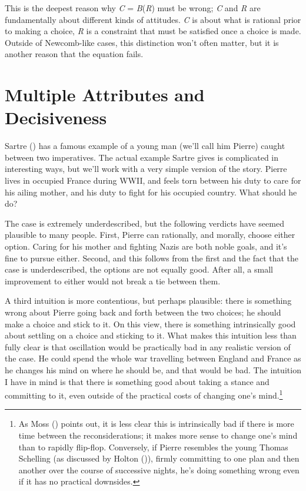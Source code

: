 \documentclass[
  11pt,
  letterpaper,
  DIV=11,
  numbers=noendperiod,
  twoside]{scrartcl}
\begin{document}
This is the deepest reason why \emph{C} = \emph{B}(\emph{R}) must be
wrong; \emph{C} and \emph{R} are fundamentally about different kinds of
attitudes. \emph{C} is about what is rational prior to making a choice,
\emph{R} is a constraint that must be satisfied once a choice is made.
Outside of Newcomb-like cases, this distinction won't often matter, but
it is another reason that the equation fails.

\section{Multiple Attributes and Decisiveness}\label{sec-sartre}

Sartre () has a famous example of a
young man (we'll call him Pierre) caught between two imperatives. The
actual example Sartre gives is complicated in interesting ways, but
we'll work with a very simple version of the story. Pierre lives in
occupied France during WWII, and feels torn between his duty to care for
his ailing mother, and his duty to fight for his occupied country. What
should he do?

The case is extremely underdescribed, but the following verdicts have
seemed plausible to many people. First, Pierre can rationally, and
morally, choose either option. Caring for his mother and fighting Nazis
are both noble goals, and it's fine to pursue either. Second, and this
follows from the first and the fact that the case is underdescribed, the
options are not equally good. After all, a small improvement to either
would not break a tie between them.

A third intuition is more contentious, but perhaps plausible: there is
something wrong about Pierre going back and forth between the two
choices; he should make a choice and stick to it. On this view, there is
something intrinsically good about settling on a choice and sticking to
it. What makes this intuition less than fully clear is that oscillation
would be practically bad in any realistic version of the case. He could
spend the whole war travelling between England and France as he changes
his mind on where he should be, and that would be bad. The intuition I
have in mind is that there is something good about taking a stance and
committing to it, even outside of the practical costs of changing one's
mind.\footnote{As Moss () points out, it is
  less clear this is intrinsically bad if there is more time between the
  reconsiderations; it makes more sense to change one's mind than to
  rapidly flip-flop. Conversely, if Pierre resembles the young Thomas
  Schelling (as discussed by Holton ()),
  firmly committing to one plan and then another over the course of
  successive nights, he's doing something wrong even if it has no
  practical downsides.}
\end{document}
